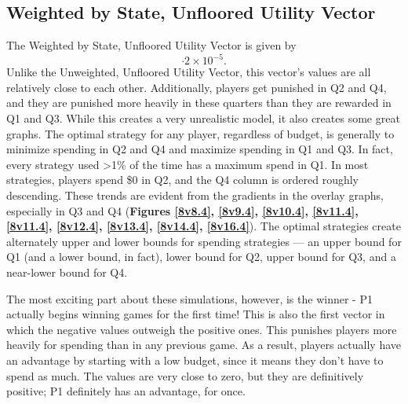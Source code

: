 \documentclass[11pt]{article}
\begin{document}
\subsection{Weighted by State, Unfloored Utility Vector}
The Weighted by State, Unfloored Utility Vector is given by 
\begin{equation}
[ 0.353833059, -0.460278059, 0.204454969, -0.480740837 ]\cdot 2\times 10^{-5}.
\end{equation}
Unlike the Unweighted, Unfloored Utility Vector, this vector's values are all relatively close to each other. Additionally, players get punished in Q2 and Q4, and they are punished more heavily in these quarters than they are rewarded in Q1 and Q3. While this creates a very unrealistic model, it also creates some great graphs. The optimal strategy for any player, regardless of budget, is generally to minimize spending in Q2 and Q4 and maximize spending in Q1 and Q3. In fact, every strategy used >1\% of the time has a maximum spend in Q1. In most strategies, players spend \$0 in Q2, and the Q4 column is ordered roughly descending. These trends are evident from the gradients in the overlay graphs, especially in Q3 and Q4 (\textbf{Figures \ref{8v8.4}, \ref{8v9.4}, \ref{8v10.4}, \ref{8v11.4}, \ref{8v11.4}, \ref{8v12.4}, \ref{8v13.4}, \ref{8v14.4}, \ref{8v16.4}}). The optimal strategies create alternately upper and lower bounds for spending strategies --- an upper bound for Q1 (and a lower bound, in fact), lower bound for Q2, upper bound for Q3, and a near-lower bound for Q4.

The most exciting part about these simulations, however, is the winner - P1 actually begins winning games for the first time! This is also the first vector in which the negative values outweigh the positive ones. This punishes players more heavily for spending than in any previous game. As a result, players actually have an advantage by starting with a low budget, since it means they don't have to spend as much. The values are very close to zero, but they are definitively positive; P1 definitely has an advantage, for once.
\end{document}
